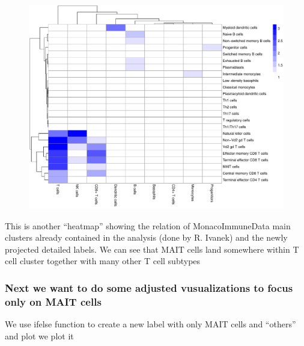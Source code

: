 \documentclass[
  letterpaper,
  DIV=11,
  numbers=noendperiod]{scrartcl}
\begin{document}
\begin{figure}[H]

{\centering \includegraphics{2-Lett-data-SingleR_pdf_files/figure-pdf/unnamed-chunk-9-1.pdf}

}

\end{figure}

This is another ``heatmap'' showing the relation of MonacoImmuneData
main clusters already contained in the analysis (done by R. Ivanek) and
the newly projected detailed labels. We can see that MAIT cells land
somewhere within T cell cluster together with many other T cell subtypes

\hypertarget{next-we-want-to-do-some-adjusted-vusualizations-to-focus-only-on-mait-cells}{%
\subsubsection{Next we want to do some adjusted vusualizations to focus
only on MAIT
cells}\label{next-we-want-to-do-some-adjusted-vusualizations-to-focus-only-on-mait-cells}}

We use ifelse function to create a new label with only MAIT cells and
``others'' and plot we plot it
\end{document}
